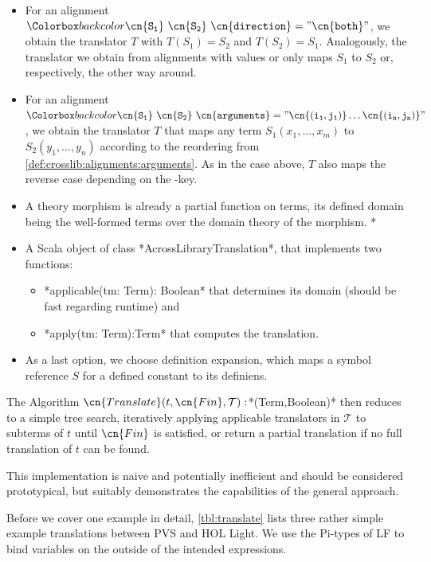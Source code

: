 \begin{itemize}
	\item For an alignment $\expr{\cn{S_1}\ \cn{S_2}\  \cn{direction}=\text{''}\cn{both}\text{''}}$, we obtain the translator $T$ with $T(S_1)=S_2$ and $T(S_2)=S_1$. Analogously, the translator we obtain from alignments with  values  or  only maps $S_1$ to $S_2$ or, respectively, the other way around.
	\item For an alignment $\expr{\cn{S_1}\ \cn{S_2}\ \cn{arguments}=\text{''}\cn{(i_1,j_1)}\ldots\cn{(i_n,j_n)}\text{''}}$, we obtain the translator $T$ that maps any term $S_1(x_1,\ldots,x_m)$ to $S_2(y_1,\ldots,y_n)$ according to the reordering from \autoref{def:crosslib:alignments:arguments}. As in the case above, $T$ also maps the reverse case depending on the -key.
	\item A theory morphism is already a partial function on \mmt terms, its defined domain being the well-formed terms over the domain theory of the morphism.
\lstMakeShortInline[language=scala]*
	\item A Scala object of class *AcrossLibraryTranslation*, that implements two functions:
		\begin{itemize}
			\item *applicable(tm: Term): Boolean* that determines its domain (should be fast regarding runtime) and
			\item *apply(tm: Term):Term* that computes the translation.
		\end{itemize}
	\item As a last option, we choose definition expansion, which maps a symbol reference $S$ for a defined constant to its definiens.
\end{itemize}
The Algorithm $\cn{Translate}(t,\cn{Fin},\mathcal T):$*(Term,Boolean)* then reduces to a simple tree search, iteratively applying applicable translators in $\mathcal T$ to subterms of $t$ until $\cn{Fin}$ is satisfied, or return a partial translation if no full translation of $t$ can be found.

\lstDeleteShortInline*

This implementation is naive and potentially inefficient and should be considered prototypical, but suitably demonstrates the capabilities of the general approach.

Before we cover one example in detail, \autoref{tbl:translate} lists three rather simple example translations between PVS and HOL Light. We use the Pi-types of LF to bind variables on the outside of the intended expressions. 

